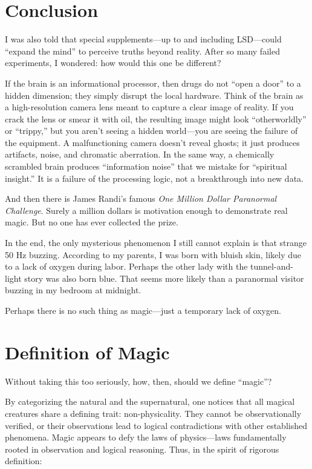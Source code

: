 \section*{Conclusion}

I was also told that special supplements—up to and including LSD—could ``expand the mind'' to perceive truths beyond reality. After so many failed experiments, I wondered: how would this one be different?

If the brain is an informational processor, then drugs do not ``open a door'' to a hidden dimension; they simply disrupt the local hardware. Think of the brain as a high-resolution camera lens meant to capture a clear image of reality. If you crack the lens or smear it with oil, the resulting image might look ``otherworldly'' or ``trippy,'' but you aren't seeing a hidden world—you are seeing the failure of the equipment. A malfunctioning camera doesn’t reveal ghosts; it just produces artifacts, noise, and chromatic aberration. In the same way, a chemically scrambled brain produces ``information noise'' that we mistake for ``spiritual insight.'' It is a failure of the processing logic, not a breakthrough into new data.

And then there is James Randi’s famous \emph{One Million Dollar Paranormal Challenge}. Surely a million dollars is motivation enough to demonstrate real magic. But no one has ever collected the prize.

In the end, the only mysterious phenomenon I still cannot explain is that strange 50 Hz buzzing. According to my parents, I was born with bluish skin, likely due to a lack of oxygen during labor. Perhaps the other lady with the tunnel-and-light story was also born blue. That seems more likely than a paranormal visitor buzzing in my bedroom at midnight.

Perhaps there is no such thing as magic—just a temporary lack of oxygen.


\section*{Definition of Magic}

Without taking this too seriously, how, then, should we define ``magic''?

By categorizing the natural and the supernatural, one notices that all magical creatures share a defining trait: non-physicality.
They cannot be observationally verified, or their observations lead to logical contradictions with other established phenomena.
Magic appears to defy the laws of physics—laws fundamentally rooted in observation and logical reasoning.
Thus, in the spirit of rigorous definition:

